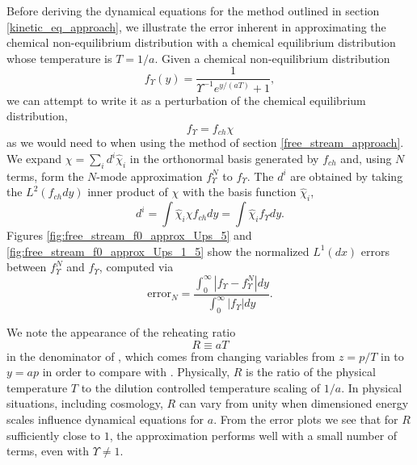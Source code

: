 Before deriving the dynamical equations for the method outlined in section \ref{kinetic_eq_approach}, we illustrate the error inherent in approximating the chemical non-equilibrium distribution   with a  chemical equilibrium distribution  whose temperature is $T=1/a$.   Given a chemical non-equilibrium distribution 
\begin{equation}\label{zeroth_approx}
f_\Upsilon (y)=\frac{1}{\Upsilon^{-1}e^{y/(aT)}+1},
\end{equation}
 we can attempt to write it as a perturbation of the chemical equilibrium distribution,  
\begin{equation}\label{chi_def}
f_\Upsilon=f_{ch}\chi
\end{equation} as we would need to when using the method of section \ref{free_stream_approach}.  We expand $\chi=\sum_i d^i\hat\chi_i$ in the orthonormal basis generated by $f_{ch}$ and, using $N$ terms, form the $N$-mode approximation $f_\Upsilon^N$ to $f_\Upsilon$.  The $d^i$ are obtained by taking the $L^2(f_{ch}dy)$ inner product of $\chi$ with the basis function $\hat\chi_i$,
\begin{equation}
d^i=\int\hat\chi_i \chi f_{ch}dy=\int\hat\chi_i  f_\Upsilon dy.
\end{equation}
 Figures \ref{fig:free_stream_f0_approx_Ups_5} and \ref{fig:free_stream_f0_approx_Ups_1_5} show the normalized $L^1(dx)$ errors between $f_\Upsilon^N$ and $f_\Upsilon$, computed via
\begin{equation}
\text{error}_N=\frac{\int_0^\infty |f_\Upsilon -f_\Upsilon ^N|dy}{\int_0^\infty |f_\Upsilon |dy}.
\end{equation}

We note the appearance of the reheating ratio
\begin{equation}\label{reheat}
 R\equiv aT  
\end{equation}
in the denominator of , which comes from changing variables from $z=p/T$ in  to $y=ap$ in order to compare with .  Physically, $R$ is the ratio of the physical temperature $T$ to the dilution controlled temperature scaling  of $1/a$.   In physical situations, including cosmology, $R$ can vary from unity when dimensioned energy scales influence dynamical equations for $a$. From the error plots we see that for $R$ sufficiently close to $1$, the approximation performs well with a small number of terms, even with $\Upsilon\neq 1$.  

